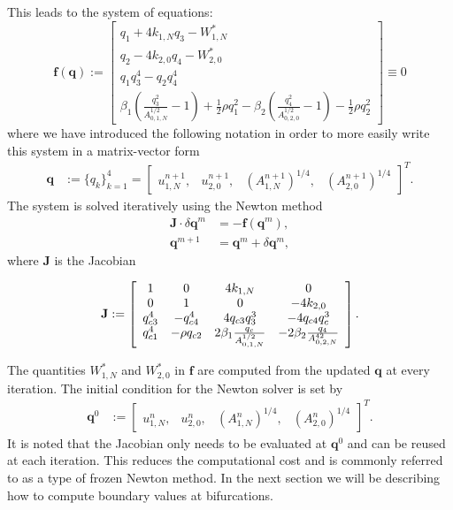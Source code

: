 \documentclass[a4paper, oneside]{discothesis}
\begin{document}
	This leads to the system of equations:
	\begin{equation}
		\mathbf{f}(\mathbf{q}) := \left[\begin{array}{c}
				q_{1}+4 k_{1,N} q_{3}-W_{1,N}^* \\
				q_{2}-4 k_{2,0} q_{4}-W_{2,0}^* \\
				q_{1} q_{3}^4-q_{2} q_{4}^4 \\
				\beta_1\left(\frac{q_{3}^2}{A_{0,1,N}^{1 / 2}}-1\right)+\frac{1}{2} \rho q_{1}^2-\beta_2\left(\frac{q_{4}^2}{A_{0,2,0}^{1 / 2}}-1\right)-\frac{1}{2} \rho q_{2}^2
		\end{array}\right] \equiv 0
	\end{equation}
	where we have introduced the following notation in order to more easily write this system in a matrix-vector form
	\begin{align}
		\mathbf{q}&:= \{q_k\}_{k=1}^4 = \left[\begin{array}{llll}
				u_{1,N}^{n+1}, & u_{2,0}^{n+1}, & \left( A_{1,N}^{n+1}\right)^{1 / 4}, & \left( A_{2,0}^{n+1} \right)^{1 / 4}
		\end{array}\right]^T. 
			\end{align}
			The system is solved iteratively using the Newton method
			\begin{align}
				\mathbf{J} \cdot \delta \mathbf{q}^m &= -\mathbf{f}\left(\mathbf{q}^m\right), \\
				\mathbf{q}^{m+1} &= \mathbf{q}^m+\delta \mathbf{q}^m,
			\end{align}
			where $\mathbf{J}$ is the Jacobian

			\begin{equation}
				\mathbf{J}:=\left[\begin{array}{c c c c}{{{1}}}&{{0}}&{{{4}k_{1,N}}}&{{0}}\\ {{0}}&{{{1}}}&{{0}}&{{-4k_{2,0}}}\\ {{q_{c3}^{4}}}&{{-q_{c4}^{4}}}&{{4q_{c3}q_{3}^{3}}}&{{-4q_{c4}q_{c}^{3}}}\\ {{q_{c1}^{4}}}&{{-\rho q_{c2}}}&{{2\beta_{1}\frac{q_{c}}{A_{0,1,N}^{1/2}}}}&{{-2\beta_{2}\frac{q_{4}}{A_{0,2,N}^{42}}}}\end{array}\right].
			\end{equation}

			The quantities $W_{1,N}^*$ and $W_{2,0}^*$ in $\mathbf{f}$ are computed from the updated $\mathbf{q}$ at every iteration.
			The initial condition for the Newton solver is set by
			\begin{align}
				\mathbf{q}^0&:=\left[\begin{array}{llll}
						u_{1,N}^{n}, & u_{2,0}^{n}, & \left( A_{1,N}^{n}\right)^{1 / 4}, & \left( A_{2,0}^{n} \right)^{1 / 4}
				\end{array}\right]^T.
					\end{align}
					It is noted that the Jacobian only needs to be evaluated at $\mathbf{q}^0$ and can be reused at each iteration.
					This reduces the computational cost and is commonly referred to as a type of frozen Newton method. \cite{jin2010class,amat2013maximum,amat2018two}
					In the next section we will be describing how to compute boundary values at bifurcations.
\end{document}
